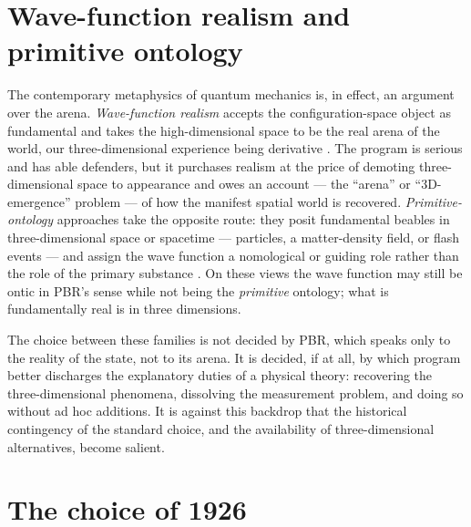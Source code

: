 \documentclass[11pt]{article}
\begin{document}
\section{Wave-function realism and primitive ontology}\label{sec:realism}

The contemporary metaphysics of quantum mechanics is, in effect, an argument over the arena. \emph{Wave-function
realism} accepts the configuration-space object as fundamental and takes the high-dimensional space to be the real
arena of the world, our three-dimensional experience being derivative \cite{Albert,NeyAlbert,Ney,Wallace}. The
program is serious and has able defenders, but it purchases realism at the price of demoting three-dimensional
space to appearance and owes an account --- the ``arena'' or ``$3$D-emergence'' problem --- of how the manifest
spatial world is recovered. \emph{Primitive-ontology} approaches take the opposite route: they posit fundamental
beables in three-dimensional space or spacetime --- particles, a matter-density field, or flash events --- and
assign the wave function a nomological or guiding role rather than the role of the primary substance
\cite{Allori,DGZ,Maudlin,Bell}. On these views the wave function may still be ontic in PBR's sense while not
being the \emph{primitive} ontology; what is fundamentally real is in three dimensions.

The choice between these families is not decided by PBR, which speaks only to the reality of the state, not to its
arena. It is decided, if at all, by which program better discharges the explanatory duties of a physical theory:
recovering the three-dimensional phenomena, dissolving the measurement problem, and doing so without ad hoc
additions. It is against this backdrop that the historical contingency of the standard choice, and the
availability of three-dimensional alternatives, become salient.

\section{The choice of 1926}\label{sec:1926}
\end{document}
